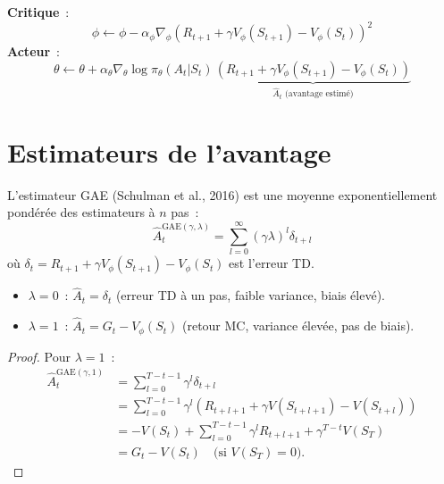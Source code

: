 \begin{formules}[title=\textbf{Mise \`a jour acteur-critique de base}]
\textbf{Critique}~:
\[
    \phi \leftarrow \phi - \alpha_\phi \nabla_\phi \left(
    R_{t+1} + \gamma V_\phi(S_{t+1}) - V_\phi(S_t) \right)^2
\]
\textbf{Acteur}~:
\[
    \theta \leftarrow \theta + \alpha_\theta \nabla_\theta \log \pi_\theta(A_t|S_t) \,
    \underbrace{\left(R_{t+1} + \gamma V_\phi(S_{t+1}) - V_\phi(S_t)\right)}_{\hat{A}_t \text{ (avantage estim\'e)}}
\]
\end{formules}

\section{Estimateurs de l'avantage}

\begin{definition}
L'estimateur GAE (Schulman et al., 2016) est une moyenne exponentiellement
pond\'er\'ee des estimateurs \`a $n$ pas~:
\[
    \hat{A}_t^{\text{GAE}(\gamma, \lambda)} = \sum_{l=0}^{\infty} (\gamma \lambda)^l \delta_{t+l}
\]
o\`u $\delta_t = R_{t+1} + \gamma V_\phi(S_{t+1}) - V_\phi(S_t)$ est l'erreur TD.
\end{definition}

\begin{proposition}
\begin{itemize}
    \item $\lambda = 0$~: $\hat{A}_t = \delta_t$ (erreur TD \`a un pas, faible variance, biais \'elev\'e).
    \item $\lambda = 1$~: $\hat{A}_t = G_t - V_\phi(S_t)$ (retour MC, variance \'elev\'ee, pas de biais).
\end{itemize}
\end{proposition}

\begin{proof}
Pour $\lambda = 1$~:
\begin{align*}
    \hat{A}_t^{\text{GAE}(\gamma, 1)} &= \sum_{l=0}^{T-t-1} \gamma^l \delta_{t+l} \\
    &= \sum_{l=0}^{T-t-1} \gamma^l (R_{t+l+1} + \gamma V(S_{t+l+1}) - V(S_{t+l})) \\
    &= -V(S_t) + \sum_{l=0}^{T-t-1} \gamma^l R_{t+l+1} + \gamma^{T-t} V(S_T) \\
    &= G_t - V(S_t) \quad \text{(si $V(S_T) = 0$)}.
\end{align*}
\end{proof}

